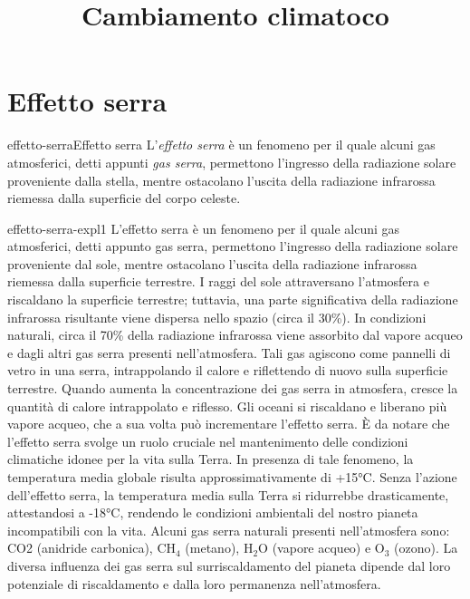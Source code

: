 \documentclass[preview]{standalone}
\begin{document}
\title{Cambiamento climatoco}
\genpage

\section{Effetto serra}

\begin{snippetdefinition}{effetto-serra}{Effetto serra}
    L'\textit{effetto serra} è un fenomeno per il quale alcuni gas
    atmosferici, detti appunti \textit{gas serra},
    permettono l'ingresso della radiazione solare proveniente dalla stella, 
    mentre ostacolano l'uscita della radiazione infrarossa riemessa dalla
    superficie del corpo celeste.
\end{snippetdefinition}

\begin{snippet}{effetto-serra-expl1}
    L'effetto serra è un fenomeno per il quale alcuni gas atmosferici, detti appunto gas serra,
    permettono l'ingresso della radiazione solare proveniente dal sole, mentre ostacolano
    l'uscita della radiazione infrarossa riemessa dalla superficie terrestre.
    I raggi del sole attraversano l'atmosfera e riscaldano la superficie terrestre; tuttavia, una
    parte significativa della radiazione infrarossa risultante viene dispersa nello spazio (circa il
    30\%). In condizioni naturali, circa il 70\% della radiazione infrarossa viene assorbito dal
    vapore acqueo e dagli altri gas serra presenti nell'atmosfera. Tali gas agiscono come
    pannelli di vetro in una serra, intrappolando il calore e riflettendo di nuovo sulla superficie
    terrestre. Quando aumenta la concentrazione dei gas serra in atmosfera, cresce la quantità
    di calore intrappolato e riflesso. Gli oceani si riscaldano e liberano più vapore acqueo, che
    a sua volta può incrementare l'effetto serra.
    È da notare che l'effetto serra svolge un ruolo cruciale nel mantenimento delle condizioni
    climatiche idonee per la vita sulla Terra. In presenza di tale fenomeno, la temperatura media
    globale risulta approssimativamente di +15°C. Senza l'azione dell'effetto serra, la
    temperatura media sulla Terra si ridurrebbe drasticamente, attestandosi a -18°C, rendendo
    le condizioni ambientali del nostro pianeta incompatibili con la vita.
    Alcuni gas serra naturali presenti nell'atmosfera sono: CO2 (anidride carbonica), CH\({}_4\)
    (metano), H\({}_2\)O (vapore acqueo) e O\({}_3\) (ozono). La diversa influenza dei gas serra sul
    surriscaldamento del pianeta dipende dal loro potenziale di riscaldamento e dalla loro
    permanenza nell'atmosfera.
\end{snippet}
\end{document}
